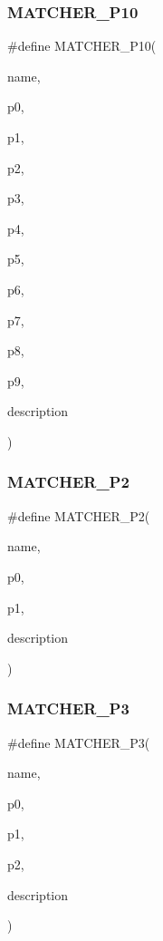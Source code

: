\subsubsection{\texorpdfstring{MATCHER\_P10}{MATCHER\_P10}}
{\footnotesize\ttfamily \#define M\+A\+T\+C\+H\+E\+R\+\_\+\+P10(\begin{DoxyParamCaption}\item[{}]{name,  }\item[{}]{p0,  }\item[{}]{p1,  }\item[{}]{p2,  }\item[{}]{p3,  }\item[{}]{p4,  }\item[{}]{p5,  }\item[{}]{p6,  }\item[{}]{p7,  }\item[{}]{p8,  }\item[{}]{p9,  }\item[{}]{description }\end{DoxyParamCaption})}

\mbox{\label{gmock-generated-matchers_8h_a78efce3ad21c8f68223f5c2d09f2e79d}} 
\subsubsection{\texorpdfstring{MATCHER\_P2}{MATCHER\_P2}}
{\footnotesize\ttfamily \#define M\+A\+T\+C\+H\+E\+R\+\_\+\+P2(\begin{DoxyParamCaption}\item[{}]{name,  }\item[{}]{p0,  }\item[{}]{p1,  }\item[{}]{description }\end{DoxyParamCaption})}

\mbox{\label{gmock-generated-matchers_8h_a507103c6251f8bf4393ec119d9e34d34}} 
\subsubsection{\texorpdfstring{MATCHER\_P3}{MATCHER\_P3}}
{\footnotesize\ttfamily \#define M\+A\+T\+C\+H\+E\+R\+\_\+\+P3(\begin{DoxyParamCaption}\item[{}]{name,  }\item[{}]{p0,  }\item[{}]{p1,  }\item[{}]{p2,  }\item[{}]{description }\end{DoxyParamCaption})}

